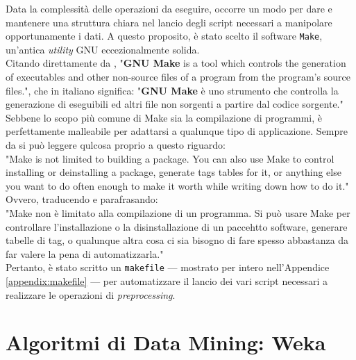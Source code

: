     Data la complessità delle operazioni da eseguire, occorre un modo per dare e mantenere una struttura chiara nel lancio degli script necessari a manipolare opportunamente i dati. A questo proposito, è stato scelto il software \texttt{Make}, un'antica \textit{utility} GNU eccezionalmente solida. \\

    Citando direttamente da \cite{make}, "\textbf{GNU Make} is a tool which controls the generation of executables and other non-source files of a program from the program's source files.", che in italiano significa: "\textbf{GNU Make} è uno strumento che controlla la generazione di eseguibili ed altri file non sorgenti a partire dal codice sorgente."\\

    Sebbene lo scopo più comune di Make sia la compilazione di programmi, è perfettamente malleabile per adattarsi a qualunque tipo di applicazione. Sempre da \cite{make} si può leggere qulcosa proprio a questo riguardo: \\

    "Make is not limited to building a package. You can also use Make to control installing or deinstalling a package, generate tags tables for it, or anything else you want to do often enough to make it worth while writing down how to do it." \\

    Ovvero, traducendo e parafrasando:\\

    "Make non è limitato alla compilazione di un programma. Si può usare Make per controllare l'installazione o la disinstallazione di un paccehtto software, generare tabelle di tag, o qualunque altra cosa ci sia bisogno di fare spesso abbastanza da far valere la pena di automatizzarla." \\

    Pertanto, è stato scritto un \texttt{makefile} --- mostrato per intero nell'Appendice \ref{appendix:makefile} --- per automatizzare il lancio dei vari script necessari a realizzare le operazioni di \textit{preprocessing}.

\section{Algoritmi di Data Mining: Weka}

